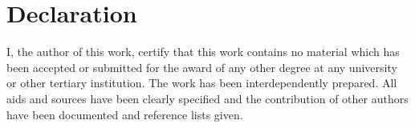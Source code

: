 \chapter{Declaration}

I, the author of this work, certify that this work contains no material which has been accepted or submitted for the award of any other degree at any university or other tertiary institution.
The work has been interdependently prepared. 
All aids and sources have been clearly specified and the contribution of other authors have been documented and reference lists given.



\signature{Eduard Szöcs}

